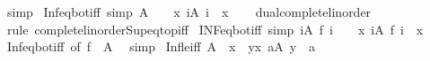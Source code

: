 \begin{isabellebody}
\ simp%
\endisatagproof
{\isafoldproof}%
%
\isadelimproof
\isanewline
%
\endisadelimproof
\isanewline
{}\isamarkupfalse%
\ Inf{\isacharunderscore}{\kern0pt}eq{\isacharunderscore}{\kern0pt}bot{\isacharunderscore}{\kern0pt}iff\ {\isacharbrackleft}{\kern0pt}simp{\isacharbrackright}{\kern0pt}{\isacharcolon}{\kern0pt}\ {\isachardoublequoteopen}{\isasymSqinter}A\ {\isacharequal}{\kern0pt}\ {\isasymbottom}\ {\isasymlongleftrightarrow}\ {\isacharparenleft}{\kern0pt}{\isasymforall}x{\isachargreater}{\kern0pt}{\isasymbottom}{\isachardot}{\kern0pt}\ {\isasymexists}i{\isasymin}A{\isachardot}{\kern0pt}\ i\ {\isacharless}{\kern0pt}\ x{\isacharparenright}{\kern0pt}{\isachardoublequoteclose}\isanewline
%
\isadelimproof
\ \ %
\endisadelimproof
%
\isatagproof
{}\isamarkupfalse%
\ dual{\isacharunderscore}{\kern0pt}complete{\isacharunderscore}{\kern0pt}linorder\isanewline
\ \ \isamarkupfalse%
\ {\isacharparenleft}{\kern0pt}rule\ complete{\isacharunderscore}{\kern0pt}linorder{\isachardot}{\kern0pt}Sup{\isacharunderscore}{\kern0pt}eq{\isacharunderscore}{\kern0pt}top{\isacharunderscore}{\kern0pt}iff{\isacharparenright}{\kern0pt}%
\endisatagproof
{\isafoldproof}%
%
\isadelimproof
\isanewline
%
\endisadelimproof
\isanewline
{}\isamarkupfalse%
\ INF{\isacharunderscore}{\kern0pt}eq{\isacharunderscore}{\kern0pt}bot{\isacharunderscore}{\kern0pt}iff\ {\isacharbrackleft}{\kern0pt}simp{\isacharbrackright}{\kern0pt}{\isacharcolon}{\kern0pt}\ {\isachardoublequoteopen}{\isacharparenleft}{\kern0pt}{\isasymSqinter}i{\isasymin}A{\isachardot}{\kern0pt}\ f\ i{\isacharparenright}{\kern0pt}\ {\isacharequal}{\kern0pt}\ {\isasymbottom}\ {\isasymlongleftrightarrow}\ {\isacharparenleft}{\kern0pt}{\isasymforall}x{\isachargreater}{\kern0pt}{\isasymbottom}{\isachardot}{\kern0pt}\ {\isasymexists}i{\isasymin}A{\isachardot}{\kern0pt}\ f\ i\ {\isacharless}{\kern0pt}\ x{\isacharparenright}{\kern0pt}{\isachardoublequoteclose}\isanewline
%
\isadelimproof
\ \ %
\endisadelimproof
%
\isatagproof
{}\isamarkupfalse%
\ Inf{\isacharunderscore}{\kern0pt}eq{\isacharunderscore}{\kern0pt}bot{\isacharunderscore}{\kern0pt}iff\ {\isacharbrackleft}{\kern0pt}of\ {\isachardoublequoteopen}f\ {\isacharbackquote}{\kern0pt}\ A{\isachardoublequoteclose}{\isacharbrackright}{\kern0pt}\ \isamarkupfalse%
\ simp%
\endisatagproof
{\isafoldproof}%
%
\isadelimproof
\isanewline
%
\endisadelimproof
\isanewline
{}\isamarkupfalse%
\ Inf{\isacharunderscore}{\kern0pt}le{\isacharunderscore}{\kern0pt}iff{\isacharcolon}{\kern0pt}\ {\isachardoublequoteopen}{\isasymSqinter}A\ {\isasymle}\ x\ {\isasymlongleftrightarrow}\ {\isacharparenleft}{\kern0pt}{\isasymforall}y{\isachargreater}{\kern0pt}x{\isachardot}{\kern0pt}\ {\isasymexists}a{\isasymin}A{\isachardot}{\kern0pt}\ y\ {\isachargreater}{\kern0pt}\ a{\isacharparenright}{\kern0pt}{\isachardoublequoteclose}\isanewline

\end{isabellebody}
